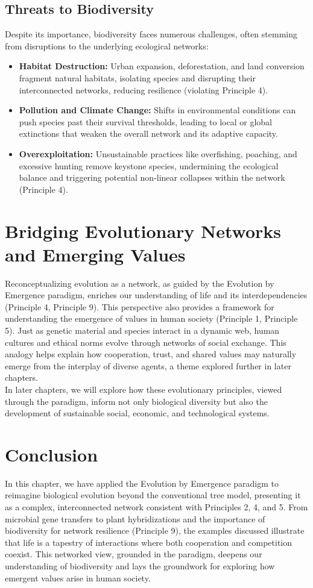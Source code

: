 \subsection{Threats to Biodiversity}
Despite its importance, biodiversity faces numerous challenges, often stemming from disruptions to the underlying ecological networks:
\begin{itemize}
    \item \textbf{Habitat Destruction:} Urban expansion, deforestation, and land conversion fragment natural habitats, isolating species and disrupting their interconnected networks, reducing resilience (violating Principle 4).
    \item \textbf{Pollution and Climate Change:} Shifts in environmental conditions can push species past their survival thresholds, leading to local or global extinctions that weaken the overall network and its adaptive capacity.
    \item \textbf{Overexploitation:} Unsustainable practices like overfishing, poaching, and excessive hunting remove keystone species, undermining the ecological balance and triggering potential non-linear collapses within the network (Principle 4).
\end{itemize} %

\section{Bridging Evolutionary Networks and Emerging Values}
Reconceptualizing evolution as a network, as guided by the Evolution by Emergence paradigm, enriches our understanding of life and its interdependencies (Principle 4, Principle 9). This perspective also provides a framework for understanding the emergence of values in human society (Principle 1, Principle 5). Just as genetic material and species interact in a dynamic web, human cultures and ethical norms evolve through networks of social exchange. This analogy helps explain how cooperation, trust, and shared values may naturally emerge from the interplay of diverse agents, a theme explored further in later chapters. \\[1ex]
In later chapters, we will explore how these evolutionary principles, viewed through the paradigm, inform not only biological diversity but also the development of sustainable social, economic, and technological systems. %

\section*{Conclusion}
In this chapter, we have applied the Evolution by Emergence paradigm to reimagine biological evolution beyond the conventional tree model, presenting it as a complex, interconnected network consistent with Principles 2, 4, and 5. From microbial gene transfers to plant hybridizations and the importance of biodiversity for network resilience (Principle 9), the examples discussed illustrate that life is a tapestry of interactions where both cooperation and competition coexist. This networked view, grounded in the paradigm, deepens our understanding of biodiversity and lays the groundwork for exploring how emergent values arise in human society. %
\cleardoublepage